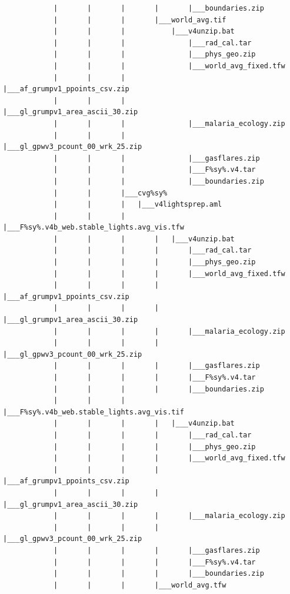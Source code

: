 \documentclass[]{book}
\begin{document}
\begin{verbatim}
            |       |       |       |       |___boundaries.zip
            |       |       |       |___world_avg.tif
            |       |       |           |___v4unzip.bat
            |       |       |               |___rad_cal.tar
            |       |       |               |___phys_geo.zip
            |       |       |               |___world_avg_fixed.tfw
            |       |       |               |___af_grumpv1_ppoints_csv.zip
            |       |       |               |___gl_grumpv1_area_ascii_30.zip
            |       |       |               |___malaria_ecology.zip
            |       |       |               |___gl_gpwv3_pcount_00_wrk_25.zip
            |       |       |               |___gasflares.zip
            |       |       |               |___F%sy%.v4.tar
            |       |       |               |___boundaries.zip
            |       |       |___cvg%sy%
            |       |       |   |___v4lightsprep.aml
            |       |       |       |___F%sy%.v4b_web.stable_lights.avg_vis.tfw
            |       |       |       |   |___v4unzip.bat
            |       |       |       |       |___rad_cal.tar
            |       |       |       |       |___phys_geo.zip
            |       |       |       |       |___world_avg_fixed.tfw
            |       |       |       |       |___af_grumpv1_ppoints_csv.zip
            |       |       |       |       |___gl_grumpv1_area_ascii_30.zip
            |       |       |       |       |___malaria_ecology.zip
            |       |       |       |       |___gl_gpwv3_pcount_00_wrk_25.zip
            |       |       |       |       |___gasflares.zip
            |       |       |       |       |___F%sy%.v4.tar
            |       |       |       |       |___boundaries.zip
            |       |       |       |___F%sy%.v4b_web.stable_lights.avg_vis.tif
            |       |       |       |   |___v4unzip.bat
            |       |       |       |       |___rad_cal.tar
            |       |       |       |       |___phys_geo.zip
            |       |       |       |       |___world_avg_fixed.tfw
            |       |       |       |       |___af_grumpv1_ppoints_csv.zip
            |       |       |       |       |___gl_grumpv1_area_ascii_30.zip
            |       |       |       |       |___malaria_ecology.zip
            |       |       |       |       |___gl_gpwv3_pcount_00_wrk_25.zip
            |       |       |       |       |___gasflares.zip
            |       |       |       |       |___F%sy%.v4.tar
            |       |       |       |       |___boundaries.zip
            |       |       |       |___world_avg.tfw

\end{verbatim}
\end{document}
